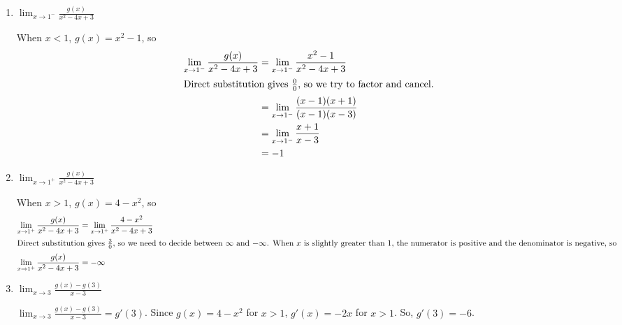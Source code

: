 \documentclass{article}
\begin{document}
\begin{enumerate}
\begin{enumerate}
  \item
    \begin{problem}[\vfill]
      $\displaystyle \lim_{x \to 1^-} \frac{g(x)}{x^2 - 4x + 3}$      
    \end{problem}

    \begin{solution}
      When $x<1$, $g(x)=x^2-1$, so
      \begin{align*}
        \lim_{x\to1^-} \frac{g(x)}{x^2-4x+3} &= \lim_{x\to1^-} \frac{x^2-1}{x^2-4x+3} \\
        \intertext{Direct substitution gives $\frac{0}{0}$, 
        so we try to factor and cancel.}
        &= \lim_{x\to1^-} \frac{(x-1)(x+1)}{(x-1)(x-3)} \\
        &= \lim_{x\to1^-} \frac{x+1}{x-3} \\
        &= -1
      \end{align*}
    \end{solution}

  \item
    \begin{problem}[\vfill]
      $\displaystyle \lim_{x \to 1^+} \frac{g(x)}{x^2 - 4x + 3}$      
    \end{problem}

    \begin{solution}
      When $x>1$, $g(x)=4-x^2$, so
      \begin{align*}
        \lim_{x\to1^+} \frac{g(x)}{x^2-4x+3} &= \lim_{x\to1^+} \frac{4-x^2}{x^2-4x+3} \\
        \intertext{Direct substitution gives $\frac{3}{0}$, 
        so we need to decide between $\infty$ and $-\infty$.
        When $x$ is slightly greater than $1$, the numerator is positive and the
        denominator is negative, so}
        \lim_{x\to1^+} \frac{g(x)}{x^2-4x+3} &= -\infty
      \end{align*}
    \end{solution}

  \item
    \begin{problem}[\vfill]
      $ \displaystyle \lim_{x\to 3}{\frac{g(x)-g(3)}{x-3}}$
    \end{problem}

    \begin{solution}
      $ \displaystyle \lim_{x\to 3}\frac{g(x)-g(3)}{x-3}=g'(3)$. Since $g(x) = 4-x^2$ for $x > 1$, $g'(x) = -2x$ for $x > 1$. So, $g'(3) = -6$.
    \end{solution}


\end{enumerate}
\end{enumerate}
\end{document}
